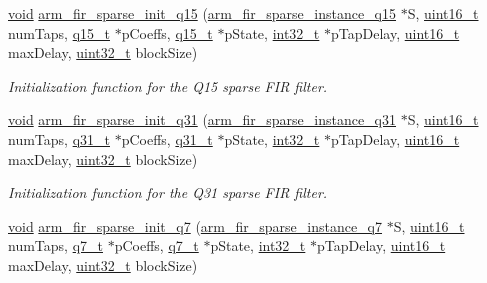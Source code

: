\begin{DoxyCompactItemize}
\hyperlink{group___n_a_m_e_ga18028b8badbf1ea7e704ccac3c488e82}{void} \hyperlink{group___f_i_r___sparse_ga5eaa80bf72bcccef5a2c5fc6648d1baa}{arm\-\_\-fir\-\_\-sparse\-\_\-init\-\_\-q15} (\hyperlink{structarm__fir__sparse__instance__q15}{arm\-\_\-fir\-\_\-sparse\-\_\-instance\-\_\-q15} $\ast$S, \hyperlink{stdint_8h_a273cf69d639a59973b6019625df33e30}{uint16\-\_\-t} num\-Taps, \hyperlink{arm__math_8h_ab5a8fb21a5b3b983d5f54f31614052ea}{q15\-\_\-t} $\ast$p\-Coeffs, \hyperlink{arm__math_8h_ab5a8fb21a5b3b983d5f54f31614052ea}{q15\-\_\-t} $\ast$p\-State, \hyperlink{group___n_a_m_e_gafd12020da5a235dfcf0c3c748fb5baed}{int32\-\_\-t} $\ast$p\-Tap\-Delay, \hyperlink{stdint_8h_a273cf69d639a59973b6019625df33e30}{uint16\-\_\-t} max\-Delay, \hyperlink{stdint_8h_a435d1572bf3f880d55459d9805097f62}{uint32\-\_\-t} block\-Size)
\begin{DoxyCompactList}\small\item\em Initialization function for the Q15 sparse F\-I\-R filter. \end{DoxyCompactList}\item 
\hyperlink{group___n_a_m_e_ga18028b8badbf1ea7e704ccac3c488e82}{void} \hyperlink{group___f_i_r___sparse_ga9a0bb2134bc85d3e55c6be6d946ee634}{arm\-\_\-fir\-\_\-sparse\-\_\-init\-\_\-q31} (\hyperlink{structarm__fir__sparse__instance__q31}{arm\-\_\-fir\-\_\-sparse\-\_\-instance\-\_\-q31} $\ast$S, \hyperlink{stdint_8h_a273cf69d639a59973b6019625df33e30}{uint16\-\_\-t} num\-Taps, \hyperlink{arm__math_8h_adc89a3547f5324b7b3b95adec3806bc0}{q31\-\_\-t} $\ast$p\-Coeffs, \hyperlink{arm__math_8h_adc89a3547f5324b7b3b95adec3806bc0}{q31\-\_\-t} $\ast$p\-State, \hyperlink{group___n_a_m_e_gafd12020da5a235dfcf0c3c748fb5baed}{int32\-\_\-t} $\ast$p\-Tap\-Delay, \hyperlink{stdint_8h_a273cf69d639a59973b6019625df33e30}{uint16\-\_\-t} max\-Delay, \hyperlink{stdint_8h_a435d1572bf3f880d55459d9805097f62}{uint32\-\_\-t} block\-Size)
\begin{DoxyCompactList}\small\item\em Initialization function for the Q31 sparse F\-I\-R filter. \end{DoxyCompactList}\item 
\hyperlink{group___n_a_m_e_ga18028b8badbf1ea7e704ccac3c488e82}{void} \hyperlink{group___f_i_r___sparse_ga98f5c1a097d4572ce4ff3b0c58ebcdbd}{arm\-\_\-fir\-\_\-sparse\-\_\-init\-\_\-q7} (\hyperlink{structarm__fir__sparse__instance__q7}{arm\-\_\-fir\-\_\-sparse\-\_\-instance\-\_\-q7} $\ast$S, \hyperlink{stdint_8h_a273cf69d639a59973b6019625df33e30}{uint16\-\_\-t} num\-Taps, \hyperlink{arm__math_8h_ae541b6f232c305361e9b416fc9eed263}{q7\-\_\-t} $\ast$p\-Coeffs, \hyperlink{arm__math_8h_ae541b6f232c305361e9b416fc9eed263}{q7\-\_\-t} $\ast$p\-State, \hyperlink{group___n_a_m_e_gafd12020da5a235dfcf0c3c748fb5baed}{int32\-\_\-t} $\ast$p\-Tap\-Delay, \hyperlink{stdint_8h_a273cf69d639a59973b6019625df33e30}{uint16\-\_\-t} max\-Delay, \hyperlink{stdint_8h_a435d1572bf3f880d55459d9805097f62}{uint32\-\_\-t} block\-Size)

\end{DoxyCompactItemize}
